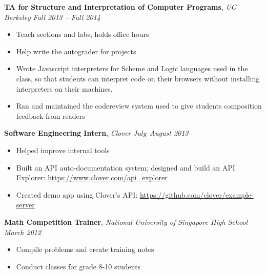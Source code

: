 \documentclass[9pt]{article}
\newenvironment{changemargin}[2]{%
  \begin{list}{}{%
      \setlength{\topsep}{0pt}%
      \setlength{\leftmargin}{#1}%
      \setlength{\rightmargin}{#2}%
      \setlength{\listparindent}{\parindent}%
      \setlength{\itemindent}{\parindent}%
      \setlength{\parsep}{\parskip}%
    }%
  \item[]}{\end{list}
}
\newenvironment{body} {
  \vspace*{-16pt}
  \begin{changemargin}{-0.25in}{-0.5in}
  }
  {\end{changemargin}
}
\begin{document}
\begin{body}
  \textbf{TA for Structure and Interpretation of Computer Programs}, \emph{UC Berkeley} \hfill \emph{Fall 2013 -- Fall 2014}\\
  \vspace*{-4pt}
  \begin{itemize} \itemsep -0pt  %
  \item Teach sections and labs, holds office hours
  \item Help write the autograder for projects
  \item Wrote Javascript interpreters for Scheme and Logic languages used in the
    class, so that students can interpret code on their browsers without
    installing interpreters on their machines.
  \item Ran and maintained the codereview system used to give students
    composition feedback from readers
  \end{itemize}

  \textbf{Software Engineering Intern}, \emph{Clover} \hfill \emph{July--August 2013}\\
  \vspace*{-4pt}
  \begin{itemize} \itemsep -0pt  %
  \item Helped improve internal tools
  \item Built an API auto-documentation system; designed and build an API     Explorer: \url{https://www.clover.com/api_explorer}
  \item Created demo app using Clover's API:     \url{https://github.com/clover/example-server}
  \end{itemize}


  \textbf{Math Competition Trainer}, \emph{National University of Singapore High School} \hfill \emph{March 2012}\\
  \vspace*{-4pt}
  \begin{itemize} \itemsep -0pt  %
  \item Compile problems and create training notes
  \item Conduct classes for grade 8-10 students
  \end{itemize}


\end{body}
\end{document}
